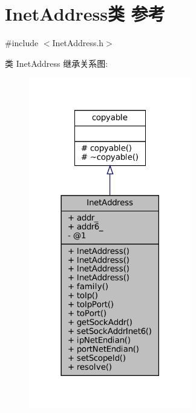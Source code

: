 \hypertarget{classmuduo_1_1net_1_1InetAddress}{}\section{Inet\+Address类 参考}
\label{classmuduo_1_1net_1_1InetAddress}


{\ttfamily \#include $<$Inet\+Address.\+h$>$}



类 Inet\+Address 继承关系图\+:
\nopagebreak
\begin{figure}[H]
\begin{center}
\leavevmode
\includegraphics[width=201pt]{classmuduo_1_1net_1_1InetAddress__inherit__graph}
\end{center}
\end{figure}


